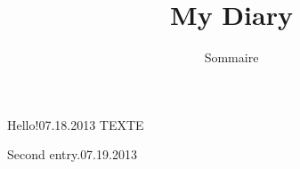 \documentclass[a4paper]{book}
\title{\Huge My Diary}
\author{Sommaire}
\date{}
\begin{document}
\maketitle
\begin{diary}{Hello!}{07.18.2013}
TEXTE
\end{diary}


\begin{diary}{Second entry.}{07.19.2013}
 \lipsum[2]
\end{diary}
\end{document}
